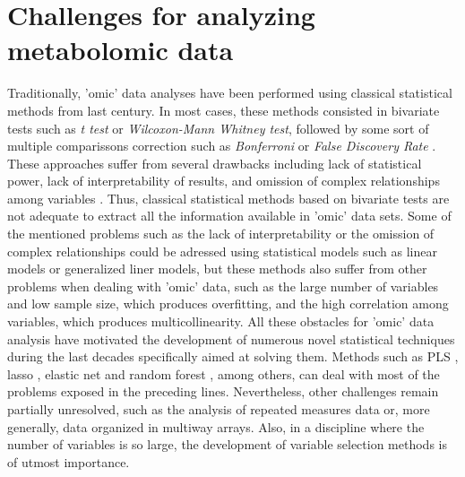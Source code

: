 \section{Challenges for analyzing metabolomic data}
\label{sec:challengesmetabodata}
Traditionally, 'omic' data analyses have been performed using classical statistical methods from last century. In most cases, these methods consisted in bivariate tests such as \textit{t test} or \textit{Wilcoxon-Mann Whitney test}, followed by some sort of multiple comparissons correction such as \textit{Bonferroni} or \textit{False Discovery Rate} \parencite{hochberg1990more, benjamini1995controlling}. These approaches suffer from several drawbacks including lack of statistical power, lack of interpretability of results, and omission of complex relationships among variables \parencite{strasak2007statistical}. Thus, classical statistical methods based on bivariate tests are not adequate to extract all the information available in 'omic' data sets.
Some of the mentioned problems such as the lack of interpretability or the omission of complex relationships could be adressed using statistical models such as linear models or generalized liner models, but these methods also suffer from other problems when dealing with 'omic' data, such as the large number of variables and low sample size, which produces overfitting, and the high correlation among variables, which produces multicollinearity. All these obstacles for 'omic' data analysis have motivated the development of numerous novel statistical techniques during the last decades specifically aimed at solving them. Methods such as PLS \parencite{wold1984collinearity}, lasso \parencite{tibshirani1996regression}, elastic net \parencite{zou2005regularization} and random forest \parencite{breiman2001random}, among others, can deal with most of the problems exposed in the preceding lines. Nevertheless, other challenges remain partially unresolved, such as the analysis of repeated measures data or, more generally, data organized in multiway arrays. Also, in a discipline where the number of variables is so large, the development of variable selection methods is of utmost importance.

